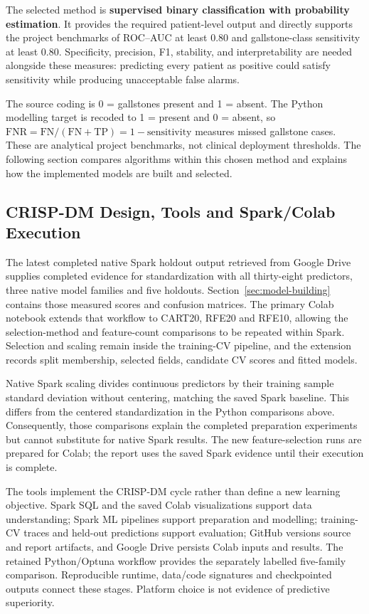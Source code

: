 The selected method is \textbf{supervised binary classification with
probability estimation}. It provides the required patient-level output and
directly supports the project benchmarks of ROC--AUC at least 0.80 and
gallstone-class sensitivity at least 0.80. Specificity, precision, F1,
stability, and interpretability are needed alongside these measures: predicting
every patient as positive could satisfy sensitivity while producing
unacceptable false alarms.

The source coding is 0 = gallstones present and 1 = absent. The Python
modelling target is recoded to 1 = present and 0 = absent, so
$\mathrm{FNR}=\mathrm{FN}/(\mathrm{FN}+\mathrm{TP})=1-\mathrm{sensitivity}$
measures missed gallstone cases. These are analytical project benchmarks,
not clinical deployment thresholds. The following section compares algorithms
within this chosen method and explains how the implemented models are built
and selected.

\subsection{CRISP-DM Design, Tools and Spark/Colab Execution}
\label{subsec:crispdm-tools}
The latest completed native Spark holdout output retrieved from Google Drive supplies completed evidence for standardization with all thirty-eight predictors, three native model families and five holdouts. Section~\ref{sec:model-building} contains those measured scores and confusion matrices. The primary Colab notebook extends that workflow to CART20, RFE20 and RFE10, allowing the selection-method and feature-count comparisons to be repeated within Spark. Selection and scaling remain inside the training-CV pipeline, and the extension records split membership, selected fields, candidate CV scores and fitted models.



Native Spark scaling divides continuous predictors by their training sample standard deviation without centering, matching the saved Spark baseline. This differs from the centered standardization in the Python comparisons above. Consequently, those comparisons explain the completed preparation experiments but cannot substitute for native Spark results. The new feature-selection runs are prepared for Colab; the report uses the saved Spark evidence until their execution is complete.


The tools implement the CRISP-DM cycle rather than define a new learning objective. Spark SQL and the saved Colab visualizations support data understanding; Spark ML pipelines support preparation and modelling; training-CV traces and held-out predictions support evaluation; GitHub versions source and report artifacts, and Google Drive persists Colab inputs and results. The retained Python/Optuna workflow provides the separately labelled five-family comparison. Reproducible runtime, data/code signatures and checkpointed outputs connect these stages. Platform choice is not evidence of predictive superiority.
